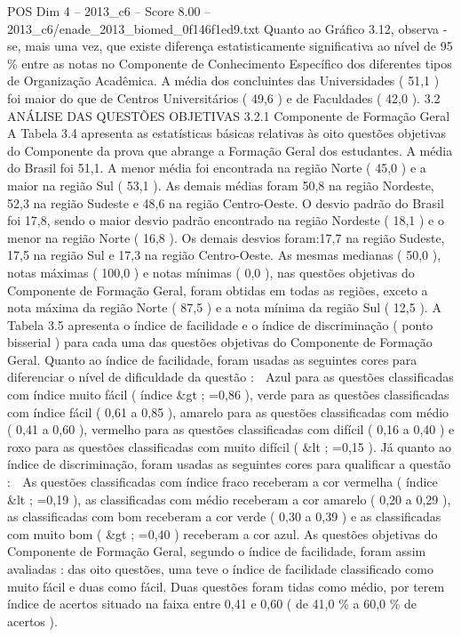 \begin{textsample}{POS Dim 4 – 2013\_c6 – Score 8.00 – 2013\_c6/enade\_2013\_biomed\_0f146f1ed9.txt}
Quanto ao Gráfico 3.12, observa -se, mais uma vez, que existe diferença estatisticamente significativa ao nível de 95 \% entre as notas no Componente de Conhecimento Específico dos diferentes tipos de Organização Acadêmica.
A média dos concluintes das Universidades ( 51,1 ) foi maior do que de Centros Universitários ( 49,6 ) e de Faculdades ( 42,0 ). 3.2 ANÁLISE DAS QUESTÕES OBJETIVAS 3.2.1 Componente de Formação Geral A Tabela 3.4 apresenta as estatísticas básicas relativas às oito questões objetivas do Componente da prova que abrange a Formação Geral dos estudantes.
A média do Brasil foi 51,1.
A menor média foi encontrada na região Norte ( 45,0 ) e a maior na região Sul ( 53,1 ).
As demais médias foram 50,8 na região Nordeste, 52,3 na região Sudeste e 48,6 na região Centro-Oeste.
O desvio padrão do Brasil foi 17,8, sendo o maior desvio padrão encontrado na região Nordeste ( 18,1 ) e o menor na região Norte ( 16,8 ).
Os demais desvios foram:17,7 na região Sudeste, 17,5 na região Sul e 17,3 na região Centro-Oeste.
As mesmas medianas ( 50,0 ), notas máximas ( 100,0 ) e notas mínimas ( 0,0 ), nas questões objetivas do Componente de Formação Geral, foram obtidas em todas as regiões, exceto a nota máxima da região Norte ( 87,5 ) e a nota mínima da região Sul ( 12,5 ).
A Tabela 3.5 apresenta o índice de facilidade e o índice de discriminação ( ponto bisserial ) para cada uma das questões objetivas do Componente de Formação Geral.
Quanto ao índice de facilidade, foram usadas as seguintes cores para diferenciar o nível de dificuldade da questão :  Azul para as questões classificadas com índice muito fácil ( índice \&gt ; =0,86 ), verde para as questões classificadas com índice fácil ( 0,61 a 0,85 ), amarelo para as questões classificadas com médio ( 0,41 a 0,60 ), vermelho para as questões classificadas com difícil ( 0,16 a 0,40 ) e roxo para as questões classificadas com muito difícil ( \&lt ; =0,15 ).
Já quanto ao índice de discriminação, foram usadas as seguintes cores para qualificar a questão :  As questões classificadas com índice fraco receberam a cor vermelha ( índice \&lt ; =0,19 ), as classificadas com médio receberam a cor amarelo ( 0,20 a 0,29 ), as classificadas com bom receberam a cor verde ( 0,30 a 0,39 ) e as classificadas com muito bom ( \&gt ; =0,40 ) receberam a cor azul.
As questões objetivas do Componente de Formação Geral, segundo o índice de facilidade, foram assim avaliadas : das oito questões, uma teve o índice de facilidade classificado como muito fácil e duas como fácil.
Duas questões foram tidas como médio, por terem índice de acertos situado na faixa entre 0,41 e 0,60 ( de 41,0 \% a 60,0 \% de acertos ).

\end{textsample}
